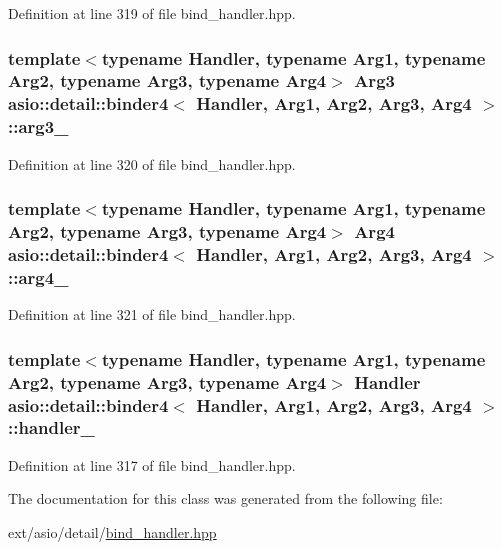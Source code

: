 Definition at line 319 of file bind\+\_\+handler.\+hpp.

\hypertarget{classasio_1_1detail_1_1binder4_ac5ae387da705816089fd2e47c35f862a}{}
\subsubsection[{arg3\+\_\+}]{\setlength{\rightskip}{0pt plus 5cm}template$<$typename Handler, typename Arg1, typename Arg2, typename Arg3, typename Arg4$>$ Arg3 {\bf asio\+::detail\+::binder4}$<$ Handler, Arg1, Arg2, Arg3, Arg4 $>$\+::arg3\+\_\+}\label{classasio_1_1detail_1_1binder4_ac5ae387da705816089fd2e47c35f862a}


Definition at line 320 of file bind\+\_\+handler.\+hpp.

\hypertarget{classasio_1_1detail_1_1binder4_abfeeba0018be820726c0273129bdcfa3}{}
\subsubsection[{arg4\+\_\+}]{\setlength{\rightskip}{0pt plus 5cm}template$<$typename Handler, typename Arg1, typename Arg2, typename Arg3, typename Arg4$>$ Arg4 {\bf asio\+::detail\+::binder4}$<$ Handler, Arg1, Arg2, Arg3, Arg4 $>$\+::arg4\+\_\+}\label{classasio_1_1detail_1_1binder4_abfeeba0018be820726c0273129bdcfa3}


Definition at line 321 of file bind\+\_\+handler.\+hpp.

\hypertarget{classasio_1_1detail_1_1binder4_a444a6e0eaaef64627f3de2afda54f35e}{}
\subsubsection[{handler\+\_\+}]{\setlength{\rightskip}{0pt plus 5cm}template$<$typename Handler, typename Arg1, typename Arg2, typename Arg3, typename Arg4$>$ Handler {\bf asio\+::detail\+::binder4}$<$ Handler, Arg1, Arg2, Arg3, Arg4 $>$\+::handler\+\_\+}\label{classasio_1_1detail_1_1binder4_a444a6e0eaaef64627f3de2afda54f35e}


Definition at line 317 of file bind\+\_\+handler.\+hpp.



The documentation for this class was generated from the following file\+:\begin{DoxyCompactItemize}
\item 
ext/asio/detail/\hyperlink{bind__handler_8hpp}{bind\+\_\+handler.\+hpp}\end{DoxyCompactItemize}
